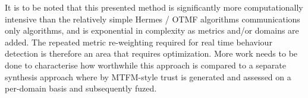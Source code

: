 \documentclass{aamas2016}
\begin{document}
It is to be noted that this presented method is significantly more computationally intensive than the relatively simple Hermes / OTMF algorithms communications only algorithms, and is exponential in complexity as metrics and/or domains are added. The repeated metric re-weighting required for real time behaviour detection is therefore an area that requires optimization. More work needs to be done to characterise how worthwhile this approach is compared to a separate synthesis approach where by MTFM-style trust is generated and assessed on a per-domain basis and subsequently fuzed.


%

%
\end{document}
